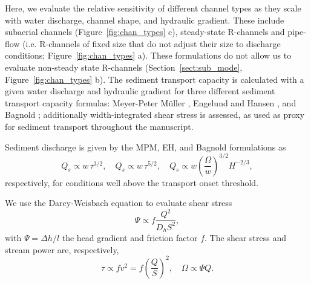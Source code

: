 \documentclass[tc, manuscript]{copernicus}
\begin{document}
Here, we evaluate the relative sensitivity of different channel types as they scale with water discharge, channel shape, and hydraulic gradient.
These include subaerial channels (Figure~\ref{fig:chan_types} c), steady-state R-channels \citep[Figure~\ref{fig:chan_types} d]{rothlisberger1972} and pipe-flow (i.e. R-channels of fixed size that do not adjust their size to discharge conditions; Figure~\ref{fig:chan_types} a).
These formulations do not allow us to evaluate non-steady state R-channels (Section~\ref{sect:sub_mode}, Figure~\ref{fig:chan_types} b).
The sediment transport capacity is calculated with a given water discharge and hydraulic gradient for three different sediment transport capacity formulas: Meyer-Peter M\"uller  \citep[MPM; ][]{meyer1948}, Engelund and Hansen \citep[EH; ][]{engelund1967}, and Bagnold \citep{bagnold1980}; additionally width-integrated shear stress is assessed, as used as proxy for sediment transport throughout the manuscript.

Sediment discharge is given by the MPM, EH, and Bagnold formulations as
\begin{equation}
  \label{eq:Qs_eq}
  Q_s \propto w\, \tau^{3/2}, \quad Q_s \propto w\, \tau^{5/2}, \quad Q_s \propto w \left(\frac{\Omega}{w}\right)^{3/2} H^{-2/3},
\end{equation}
respectively, for conditions well above the transport onset threshold.

We use the Darcy-Weisbach equation to evaluate shear stress
\begin{equation}
  \label{eq:DW}
  \Psi \propto f\frac{Q^2}{D_h S^2},
\end{equation}
with $\Psi = \Delta h / l$ the head gradient and friction factor $f$.
The shear stress and stream power are, respectively,
\begin{equation}
  \label{eq:tau-omega}
  \tau \propto f v^2 = f \left(\frac{Q}{S}\right)^2, \quad  \Omega \propto \Psi Q.
\end{equation}
% 
\end{document}
